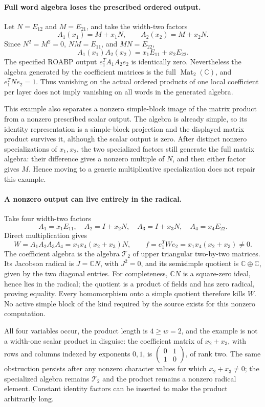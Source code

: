\paragraph{Full word algebra loses the prescribed ordered output.}
Let $N=E_{12}$ and $M=E_{21}$, and take the width-two factors
\[
 A_1(x_1)=M+x_1N,\qquad A_2(x_2)=M+x_2N.
\]
Since $N^2=M^2=0$, $NM=E_{11}$, and $MN=E_{22}$,
\[
 A_1(x_1)A_2(x_2)=x_1E_{11}+x_2E_{22}.
\]
The specified ROABP output $e_1^TA_1A_2e_2$ is identically zero.
Nevertheless the algebra generated by the coefficient matrices
is the full $\operatorname{Mat}_2(\mathbb C)$, and
$e_1^TNe_2=1$.  Thus vanishing on the actual ordered products
of one local coefficient per layer does not imply vanishing on
all words in the generated algebra.

This example also separates a nonzero simple-block image of the
matrix product from a nonzero prescribed scalar output.  The
algebra is already simple, so its identity representation is a
simple-block projection and the displayed matrix product survives
it, although the scalar output is zero.  After distinct nonzero
specializations of $x_1,x_2$, the two specialized factors still
generate the full matrix algebra: their difference gives a
nonzero multiple of $N$, and then either factor gives $M$.
Hence moving to a generic multiplicative specialization does not
repair this example.

\paragraph{A nonzero output can live entirely in the radical.}
Take four width-two factors
\[
 A_1=x_1E_{11},\quad A_2=I+x_2N,\quad
 A_3=I+x_3N,\quad A_4=x_4E_{22}.
\]
Direct multiplication gives
\[
 W=A_1A_2A_3A_4=x_1x_4(x_2+x_3)N,\qquad
 f=e_1^TWe_2=x_1x_4(x_2+x_3)\ne0.
 \tag{I.27}
\]
The coefficient algebra is the algebra $\mathcal T_2$ of upper
triangular two-by-two matrices.  Its Jacobson radical is
$J=\mathbb C N$, with $J^2=0$, and its semisimple quotient is
$\mathbb C\oplus\mathbb C$, given by the two diagonal entries.
For completeness, $\mathbb C N$ is a square-zero ideal, hence
lies in the radical; the quotient is a product of fields and
has zero radical, proving equality.  Every homomorphism onto
a simple quotient therefore kills $W$.  No active simple block
of the kind required by the source exists for this nonzero
computation.

All four variables occur, the product length is $4\ge w=2$,
and the example is not a width-one scalar product in disguise:
the coefficient matrix of $x_2+x_3$, with rows and columns
indexed by exponents $0,1$, is
$\left(\begin{smallmatrix}0&1\\1&0\end{smallmatrix}\right)$,
of rank two.  The same obstruction persists after any nonzero
character values for which $x_2+x_3\ne0$; the specialized
algebra remains $\mathcal T_2$ and the product remains a
nonzero radical element.  Constant identity factors can be
inserted to make the product arbitrarily long.

